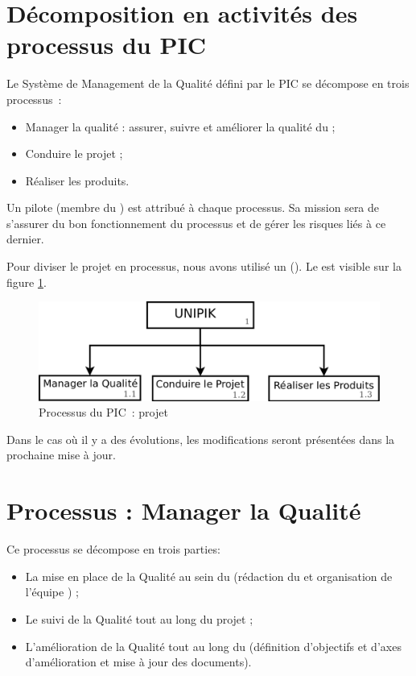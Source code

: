 
\section{Décomposition en activités des processus du PIC}

Le Système de Management de la Qualité défini par le PIC \nomPIC{} se décompose en trois processus~:
\begin{itemize}
 \item Manager la qualité : assurer, suivre et améliorer la qualité du \PICCourt ; 
 \item Conduire le projet ;
 \item Réaliser les produits. \\
\end{itemize}

Un pilote (membre du \PICCourt) est attribué à chaque processus. Sa mission sera de s'assurer du bon fonctionnement du processus et de gérer les risques liés à ce dernier.

Pour diviser le projet en processus, nous avons utilisé un \WBS{} (\WBSCourt). Le \WBSCourt{} est visible sur la figure \ref{WBS1}.

\begin{figure}[H]
\centering
 \includegraphics[width=14cm]{images/organigramme_processus_pic.png}
 \caption{Processus du PIC~: projet \nomEquipe{}}
 \label{WBS1}
\end{figure}

 Dans le cas où il y a des évolutions, les modifications seront présentées dans la prochaine mise à jour.
\newpage
 
\section{Processus : Manager la Qualité}
\label{ProcessusQualite}
Ce processus se décompose en trois parties:
\begin{itemize}
\item La mise en place de la Qualité au sein du \PICCourt{} (rédaction du \PQ{} et organisation de l'équipe \PICCourt) ; 
\item Le suivi de la Qualité tout au long du projet ; 
\item L'amélioration de la Qualité tout au long du \PICCourt{} (définition d'objectifs et d'axes d'amélioration et mise à jour des documents). 
\end{itemize}
